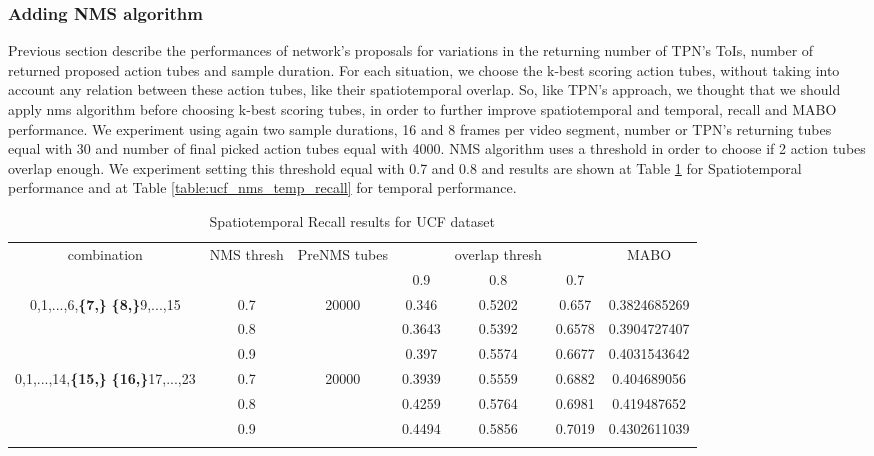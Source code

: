 \subsubsection{Adding NMS algorithm}

Previous section describe the performances of network's proposals for variations in the returning number of TPN's ToIs, number of returned
proposed action tubes and sample duration. For each situation, we choose the k-best scoring action tubes, without taking into account
any relation between these action tubes, like their spatiotemporal overlap. So, like TPN's approach, we thought that we should apply
nms algorithm before choosing k-best scoring tubes, in order to further improve  spatiotemporal and temporal, recall and MABO  performance.
We experiment using again two sample durations, 16 and 8 frames per video segment, number or TPN's returning tubes equal with 30 and
number of final picked action tubes equal with 4000. NMS algorithm uses a threshold in order to choose if 2 action tubes overlap enough. We
experiment setting this threshold equal with 0.7 and 0.8 and results are shown at Table \ref{table:ucf_nms_recall} for Spatiotemporal
performance and at Table \ref{table:ucf_nms_temp_recall} for temporal performance.

\begin{center}
  \setlength{\tabcolsep}{2pt}
\begin{longtable}{||c | c | c | c c c| c|}

  \hline
  \multirow{2}{*}{combination} & \multirow{2}{2.5em}{NMS thresh} & \multirow{2}{3.5em}{PreNMS tubes} &  {} &overlap thresh & {} & \multirow{2}{*}{MABO} \\
  {} & {} & {} &  0.9 &  0.8 & 0.7 & {}\\         
  \hline
  \multirow{3}{7em}{0,1,...,6,\textbf{\{7,\}}
  \textbf{\{8,\}}9,...,15 }  & 0.7 &\multirow{3}{*}{20000}  & 0.346 & 0.5202 & 0.657 & 0.3824685269 \\
  \cline{2-2} \cline{4-7} 
  {} &  0.8   & {}   & 0.3643 & 0.5392 & 0.6578 & 0.3904727407 \\
  \cline{2-2} \cline{4-7} 
  {} &  0.9   & {}   & 0.397  & 0.5574 & 0.6677 & 0.4031543642 \\
  \hline                                    
  \multirow{3}{7em}{0,1,...,14,\textbf{\{15,\}}
  \textbf{\{16,\}}17,...,23 }  & 0.7 & \multirow{3}{*}{20000}   & 0.3939 & 0.5559  & 0.6882 & 0.404689056 \\
  \cline{2-2} \cline{4-7} 
                                    {} &  0.8   & {}   & 0.4259 & 0.5764 & 0.6981 & 0.419487652 \\
  \cline{2-2} \cline{4-7} 
                                    {} &  0.9   & {}   & 0.4494 & 0.5856 & 0.7019 & 0.4302611039 \\

  \hline                                    

  \caption{Spatiotemporal Recall results for UCF dataset}
  \label{table:ucf_nms_recall}
\end{longtable} 
\end{center}

